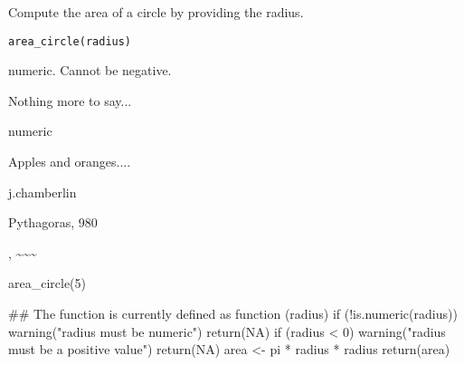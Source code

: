 \documentclass[a4paper]{book}
\begin{document}
%
\begin{Description}\relax
Compute the area of a circle by providing the radius.
\end{Description}
%
\begin{Usage}
\begin{verbatim}
area_circle(radius)
\end{verbatim}
\end{Usage}
%
\begin{Arguments}
\begin{ldescription}
\item[\code{radius}] numeric. Cannot be negative.
\end{ldescription}
\end{Arguments}
%
\begin{Details}\relax
Nothing more to say...
\end{Details}
%
\begin{Value}
numeric
\end{Value}
%
\begin{Note}\relax
Apples and oranges....
\end{Note}
%
\begin{Author}\relax
j.chamberlin
\end{Author}
%
\begin{References}\relax
Pythagoras, 980
\end{References}
%
\begin{SeeAlso}\relax
{}, \textasciitilde{}\textasciitilde{}\textasciitilde{}
\end{SeeAlso}
%
\begin{Examples}
\begin{ExampleCode}
 
area_circle(5)


## The function is currently defined as
function (radius) 
{
    if (!is.numeric(radius)) {
        warning("radius must be numeric")
        return(NA)
    }
    if (radius < 0) {
        warning("radius must be a positive value")
        return(NA)
    }
    area <- pi * radius * radius
    return(area)
  }
\end{ExampleCode}
\end{Examples}
\printindex{}
\end{document}
